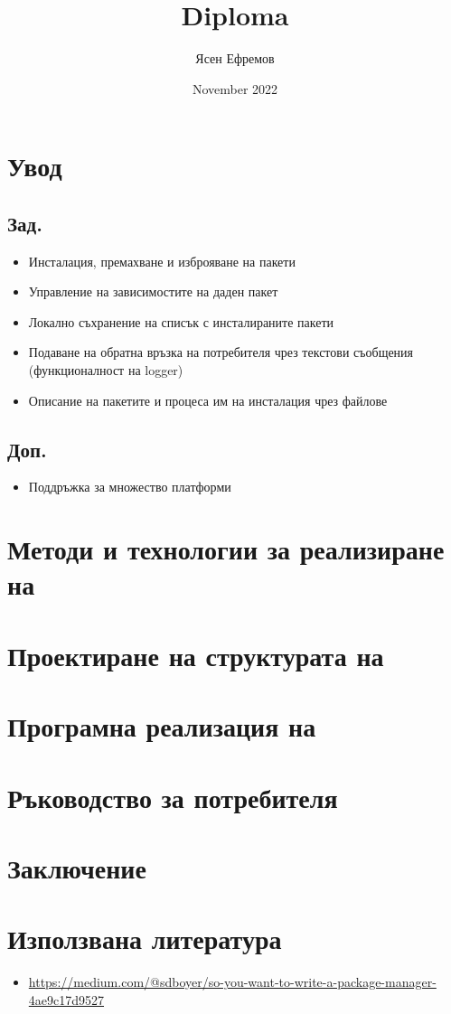 \documentclass{report}
\title{Diploma}
\author{Ясен Ефремов}
\date{November 2022}
\begin{document}
\maketitle

\chapter*{Увод}

\section*{Зад.}
\begin{itemize}
    \item Инсталация, премахване и изброяване на пакети
    \item Управление на зависимостите на даден пакет
    \item Локално съхранение на списък с инсталираните пакети
    \item Подаване на обратна връзка на потребителя чрез текстови съобщения (функционалност на logger)
    \item Описание на пакетите и процеса им на инсталация чрез файлове
\end{itemize}

\section*{Доп.}
\begin{itemize}
    \item Поддръжка за множество платформи
\end{itemize}


\chapter{Методи и технологии за реализиране на}



\chapter{Проектиране на структурата на}



\chapter{Програмна реализация на}



\chapter{Ръководство за потребителя}



\chapter*{Заключение}


\chapter{Използвана литература}

\begin{itemize}
  \item \url{https://medium.com/@sdboyer/so-you-want-to-write-a-package-manager-4ae9c17d9527}
\end{itemize}


\tableofcontents
\end{document}

